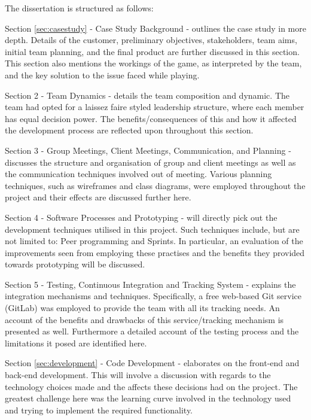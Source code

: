 \documentclass{l3proj}
\begin{document}
The dissertation is structured as follows:

Section \ref{sec:casestudy} - Case Study Background - outlines the case study in more depth. Details of the customer, preliminary objectives, stakeholders, team aims, initial team planning, and the final product are further discussed in this section. This section also mentions the workings of the game, as interpreted by the team, and the key solution to the issue faced while playing.

Section 2 -  Team Dynamics - details the team composition and dynamic. The team had opted for a laissez faire styled leadership structure, where each member has equal decision power. The benefits/consequences of this and how it affected the development process are reflected upon throughout this section.

Section 3 - Group Meetings, Client Meetings, Communication, and Planning - discusses the structure and organisation of group and client meetings as well as the communication techniques involved out of meeting. Various planning techniques, such as wireframes and class diagrams, were employed throughout the project and their effects are discussed further here.

Section 4 - Software Processes and Prototyping - will directly pick out the development techniques utilised in this project. Such techniques include, but are not limited to: Peer programming and Sprints. In particular, an evaluation of the improvements seen from employing these practises and the benefits they provided towards prototyping will be discussed.

Section 5 - Testing, Continuous Integration and Tracking System - explains the integration mechanisms and techniques. Specifically, a free web-based Git service (GitLab) was employed to provide the team with all its tracking needs. An account of the benefits and drawbacks of this service/tracking mechanism is presented as well. Furthermore a detailed account of the testing process and the limitations it posed are identified here.

Section \ref{sec:development} - Code Development - elaborates on the front-end and back-end development. This will involve a discussion with regards to the technology choices made and the affects these decisions had on the project. The greatest challenge here was the learning curve involved in the technology used and trying to implement the required functionality.


\end{document}
